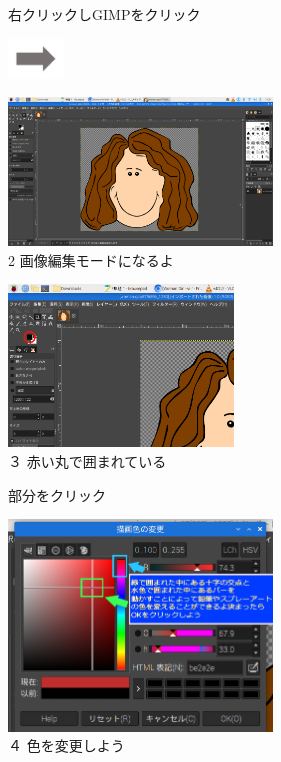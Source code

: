 \documentclass[a4paper,12pt]{jarticle}
\begin{document}
\begin{figure}[ht]
\begin{minipage}{\textwidth}
\begin{minipage}{5.852cm}
      右クリックしGIMPをクリック
    \end{minipage}
    \includegraphics[width=1.489cm]{textbook-img128.png}
    \begin{minipage}{7.975cm}
      \includegraphics[width=7cm]{textbook-img125.png}\\
      2 画像編集モードになるよ
    \end{minipage}


  \end{minipage}
  \bigskip




  \begin{minipage}{\textwidth}
    \begin{minipage}{5.984cm}
      \includegraphics[width=5.971cm]{textbook-img129.png}\\
      ３ 赤い丸で囲まれている

      部分をクリック


      \bigskip
    \end{minipage}
    \hfill
    \begin{minipage}{8.984cm}
      \includegraphics[width=7cm]{textbook-img126.png}\\
      ４ 色を変更しよう


\end{minipage}
\end{minipage}
\end{figure}
\end{document}
